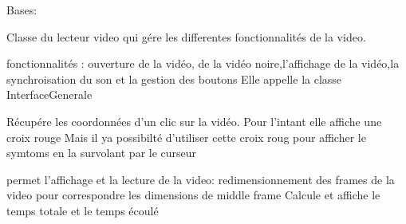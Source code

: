 \documentclass[letterpaper,10pt,english]{sphinxmanual}
\begin{document}
\begin{fulllineitems}
\label{\detokenize{general_interface:general_interface_V9.LecteurVideo}}
\pysigstartsignatures
{}
\pysigstopsignatures
\sphinxAtStartPar
Bases: 

\sphinxAtStartPar
Classe du lecteur video qui gére les differentes fonctionnalités de la video.

\sphinxAtStartPar
fonctionnalités : ouverture de la vidéo, de la vidéo noire,l’affichage de la vidéo,la synchroisation du son et la gestion des boutons
Elle appelle la classe InterfaceGenerale


\begin{fulllineitems}

\pysigstartsignatures
{}
\pysigstopsignatures
\end{fulllineitems}


\begin{fulllineitems}
\label{\detokenize{general_interface:general_interface_V9.LecteurVideo.afficher_menu_annotations}}
\pysigstartsignatures
{}
\pysigstopsignatures
\sphinxAtStartPar
Récupére les coordonnées d’un clic sur la vidéo. Pour l’intant elle affiche une croix rouge
Mais il ya possibilté d’utiliser cette croix roug pour afficher le symtoms en la survolant
par le curseur

\end{fulllineitems}


\begin{fulllineitems}
\label{\detokenize{general_interface:general_interface_V9.LecteurVideo.afficher_video}}
\pysigstartsignatures
{}
\pysigstopsignatures
\sphinxAtStartPar
permet l’affichage et la lecture de la video:
redimensionnement des frames de la video pour correspondre les dimensions de middle frame
Calcule et affiche le temps totale et le temps écoulé


\end{fulllineitems}
\end{fulllineitems}
\end{document}
